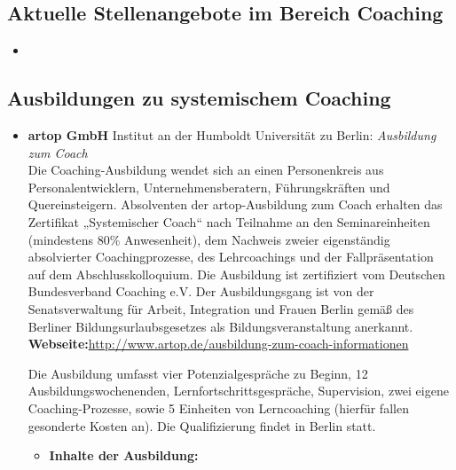 \documentclass[11pt,a4paper]{article}
\begin{document}
\subsection*{\textsf{Aktuelle Stellenangebote im Bereich Coaching}}


\begin{itemize}
\item 
\end{itemize}


\subsection*{\textsf{Ausbildungen zu systemischem Coaching}}



\begin{itemize}
\item \textbf{artop GmbH} Institut an der Humboldt Universität zu Berlin: \textsl{Ausbildung zum Coach}\\
Die Coaching-Ausbildung wendet sich an einen Personenkreis aus Personalentwicklern, Unternehmensberatern, Führungskräften und Quereinsteigern. Absolventen der artop-Ausbildung zum Coach erhalten das Zertifikat „Systemischer Coach“ nach Teilnahme an den Seminareinheiten (mindestens 80\% Anwesenheit), dem Nachweis zweier eigenständig absolvierter Coachingprozesse, des Lehrcoachings und der Fallpräsentation auf dem Abschlusskolloquium. Die Ausbildung ist zertifiziert vom Deutschen Bundesverband Coaching e.V. Der Ausbildungsgang ist von der Senatsverwaltung für Arbeit, Integration und Frauen Berlin gemäß des Berliner Bildungsurlaubsgesetzes als Bildungsveranstaltung anerkannt.\\
\textbf{Webseite:}\textsf{\textcolor{MidnightBlue}{\url{http://www.artop.de/ausbildung-zum-coach-informationen}}}

Die Ausbildung umfasst vier Potenzialgespräche zu Beginn, 12 Ausbildungswochenenden, Lernfortschrittsgespräche, Supervision, zwei eigene Coaching-Prozesse, sowie 5 Einheiten von Lerncoaching (hierfür fallen gesonderte Kosten an). Die Qualifizierung findet in Berlin statt.
	\begin{itemize}
	\item \textbf{Inhalte der Ausbildung:}
		

\end{itemize}
\end{itemize}
\end{document}
